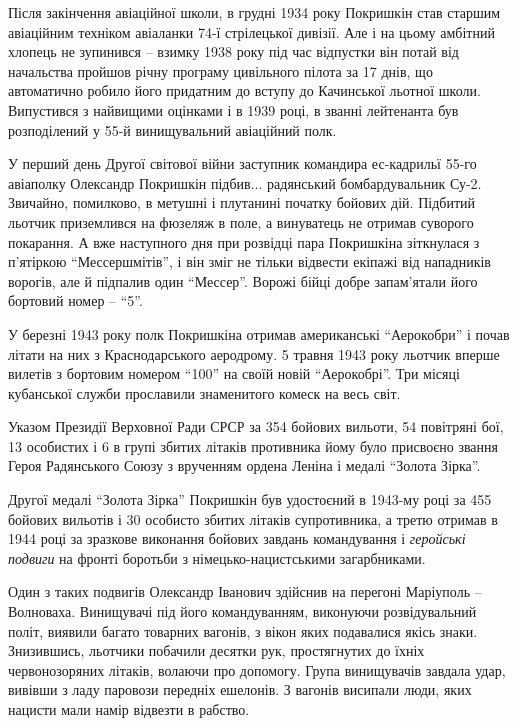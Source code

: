 Після закінчення авіаційної школи, в грудні 1934 року Покришкін став старшим
авіаційним техніком авіаланки 74-ї стрілецької дивізії. Але і на цьому амбітний
хлопець не зупинився – взимку 1938 року під час відпустки він потай від
начальства пройшов річну програму цивільного пілота за 17 днів, що автоматично
робило його придатним до вступу до Качинської льотної школи. Випустився з
найвищими оцінками і в 1939 році, в званні лейтенанта був розподілений у 55-й
винищувальний авіаційний полк.

У перший день Другої світової війни заступник командира ес\hyp{}кадрильї 55-го
авіаполку Олександр Покришкін підбив... радянський бомбардувальник Су-2.
Звичайно, помилково, в метушні і плутанині початку бойових дій. Підбитий
льотчик приземлився на фюзеляж в поле, а винуватець не отримав суворого
покарання. А вже наступного дня при розвідці пара Покришкіна зіткнулася з
п'ятіркою \enquote{Мессершмітів}, і він зміг не тільки відвести екіпажі від нападників
ворогів, але й підпалив один \enquote{Мессер}. Ворожі бійці добре запам'ятали його
бортовий номер – \enquote{5}.

У березні 1943 року полк Покришкіна отримав американські \enquote{Аерокобри}  і почав
літати на них з Краснодарського аеродрому. 5 травня 1943 року льотчик вперше
вилетів з бортовим номером \enquote{100} на своїй новій \enquote{Аерокобрі}. Три місяці
кубанської служби прославили знаменитого комеск на весь світ.

Указом Президії Верховної Ради СРСР за 354 бойових вильоти, 54 повітряні бої,
13 особистих і 6 в групі збитих літаків противника йому було присвоєно звання
Героя Радянського Союзу з врученням ордена Леніна і медалі \enquote{Золота Зірка}.

Другої медалі \enquote{Золота Зірка}  Покришкін був удостоєний в 1943-му році за 455
бойових вильотів і 30 особисто збитих літаків супротивника, а третю отримав в
1944 році за зразкове виконання бойових завдань командування і \emph{геройські
подвиги} на фронті боротьби з німецько-нацистськими загарбниками.


Один з таких подвигів Олександр Іванович здійснив на перегоні Маріуполь –
Волноваха. Винищувачі під його командуванням, виконуючи розвідувальний політ,
виявили багато товарних вагонів, з вікон яких подавалися якісь знаки.
Знизившись, льотчики побачили десятки рук, простягнутих до їхніх червонозоряних
літаків, волаючи про допомогу. Група винищувачів завдала удар, вивівши з ладу
паровози передніх ешелонів. З вагонів висипали люди, яких нацисти мали намір
відвезти в рабство.

